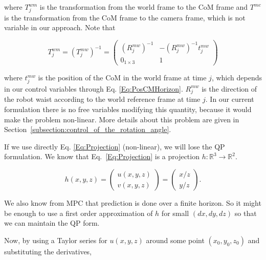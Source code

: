 where $T^{wm}_j$ is the transformation from the world frame to the CoM frame and $T^{mc}$ is the transformation from the CoM frame to the camera frame, which is not variable in our approach. Note that

$$
T^{wm}_j = (T^{mw}_j)^{-1} = 
\left(
\begin{matrix}
(R^{mw}_j)^{-1} & -(R^{mw}_j)^{-1}t^{mw}_j \\
0_{1 \times 3} & 1
\end{matrix}
\right)
$$ 

where $t^{mw}_j$ is the position of the CoM in the world frame at time $j$, which depends in our control variables through Eq. \ref{Eq:PosCMHorizon}.
$R^{mw}_j$ is the direction of the robot waist according to the world reference frame at time $j$. In our current formulation 
there is no free variables modifying this quantity, because it would make the problem non-linear. More details
about this problem are given in Section~\ref{subsection:control_of_the_rotation_angle}.

If we use directly Eq. \ref{Eq:Projection} (non-linear), we will lose the QP formulation. 
We know that Eq.~\ref{Eq:Projection} is a projection $h:\mathbb{R}^3 \rightarrow \mathbb{R}^2$.

\begin{equation*}
h(x,y,z) =
 \left(
 \begin{matrix}
  u(x,y,z) \\
  v(x,y,z)
 \end{matrix}
 \right)
 = \left(
 \begin{matrix}
  x / z\\
  y / z
 \end{matrix}
 \right).
\end{equation*}


We also know from MPC that prediction is done over a finite horizon. So it might be enough to use a first order approximation of $h$ for small $(dx,dy,dz)$ so that we can maintain the QP form.

Now, by using a Taylor series for $u(x,y,z)$ around some point $(x_0,y_0,z_0)$ and substituting the derivatives,


